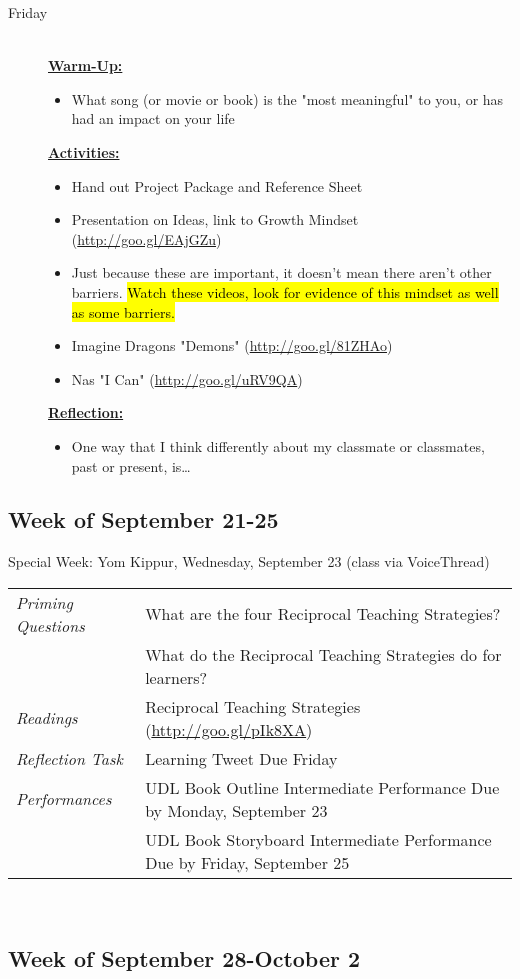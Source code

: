 \documentclass{tufte-handout}
\newcommand{\tabpq}{\faQuestionCircle\medspace\textit{Priming Questions}}
\newcommand{\tabread}{\faBook\medspace\textit{Readings}}
\newcommand{\tabperformance}{\faTasks\medspace\textit{Performances}}
\newcommand{\tabtweet}{\faLightbulbO\medspace\textit{Reflection Task} & Learning Tweet Due Friday \\}
\newenvironment{tabsched}
	{\small
	\begin{tabular}{p{1.5in}p{4.5in}}
	\toprule}
	{\bottomrule
	\end{tabular}
	\normalsize\\}
\newenvironment{specweek}
	{\begin{center}
		\fontseries{b} \faBullhorn \medspace Special Week: }
		{\medspace \faBullhorn \fontseries{m}
	\end{center}}
\newcommand{\weeksix}{September 21-25}
\newcommand{\weekseven}{September 28-October 2}
\newcommand{\yomkippur}{Yom Kippur, Wednesday, September 23 (class via VoiceThread)}
\newcommand{\listfri}{\item[Friday] \hfill \\}
\newenvironment{daywu}
	{\textbf{\underline{Warm-Up:}} \hfill \\
	\begin{itemize}}
	{\end{itemize}}
\newenvironment{dayact}
	{\textbf{\underline{Activities:}} \hfill \\
	\begin{itemize}}
	{\end{itemize}}
\newenvironment{dayref}
	{\textbf{\underline{Reflection:}} \hfill \\
	\begin{itemize}}
	{\end{itemize}}
\newenvironment{weeksched}
	{\noindent
	\begin{description}}
	{\end{description}
	\newpage}
\begin{document}
\begin{fullwidth}
\begin{weeksched}
\listfri
	\begin{daywu}
		\item What song (or movie or book) is the "most meaningful" to you, or has had an impact on your life
	\end{daywu}
	\begin{dayact}
		\item Hand out Project Package and Reference Sheet
		\item Presentation on Ideas, link to Growth Mindset (\url{http://goo.gl/EAjGZu})
		\item Just because these are important, it doesn't mean there aren't other barriers. \hl{Watch these videos, look for evidence of this mindset as well as some barriers.}
		\item Imagine Dragons "Demons" (\url{http://goo.gl/81ZHAo})
		\item Nas "I Can" (\url{http://goo.gl/uRV9QA})
	\end{dayact}
	\begin{dayref}
		\item One way that I think differently about my classmate or classmates, past or present, is\ldots
	\end{dayref}

\end{weeksched}


\subsection{Week of \weeksix}

\begin{specweek}\yomkippur\end{specweek}

\begin{tabsched}
	\tabpq & What are the four Reciprocal Teaching Strategies? \\
	& What do the Reciprocal Teaching Strategies do for learners? \\
	\midrule
	\tabread & Reciprocal Teaching Strategies (\url{http://goo.gl/pIk8XA}) \\
	\midrule
	\tabtweet
	\midrule
	\tabperformance & UDL Book Outline Intermediate Performance Due by Monday, September 23 \\
	& UDL Book Storyboard Intermediate Performance Due by Friday, September 25 \\

\end{tabsched}

\subsection{Week of \weekseven}


\end{fullwidth}
\end{document}
